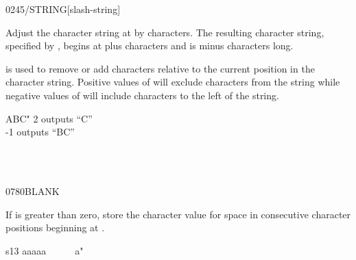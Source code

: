 \begin{worddef}{0245}{/STRING}[slash-string]
\item {}

	Adjust the character string at  by 
	characters. The resulting character string, specified by
	, begins at  plus 
	characters and is  minus  characters long.

	\begin{rationale} %
		 is used to remove or add characters relative
		to the current position in the character string. Positive values
		of  will exclude characters from the string while
		negative values of  will include characters to the
		left of the string.

		 ABC" 2     outputs ``C'' \\
		-1    outputs ``BC''
	\end{rationale}

	\begin{testing} %
		 \\
		 \\
	\end{testing}
\end{worddef}


\begin{worddef}{0780}{BLANK}
\item {}

	If  is greater than zero, store the character value for
	space in  consecutive character positions beginning at
	.

	\begin{testing} %
		\ttfamily
		\word{:} s13  aaaaa~~~~~~a" \word{;}						\tab[4.5]  

							\tab[2.8]   \\
			\tab[1]   \\
									\tab[2.2]  
	\end{testing}
\end{worddef}


